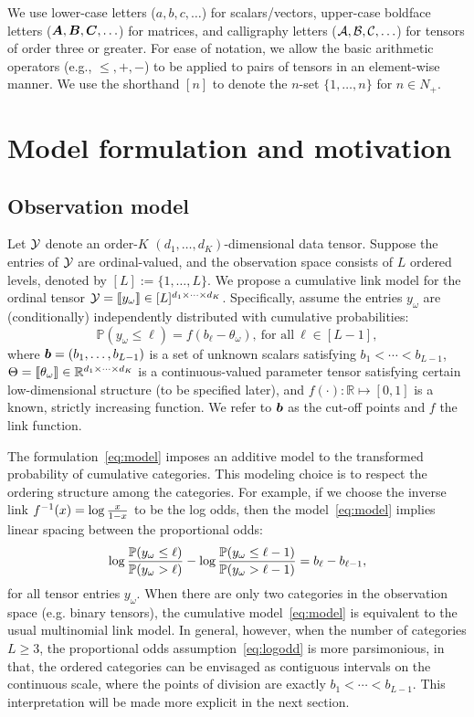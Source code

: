 \documentclass[11pt]{article}
\theoremstyle{plain}
\theoremstyle{definition}
\begin{document}
We use lower-case letters ($a, b, c, \ldots$) for scalars/vectors, upper-case boldface letters ($\bm A, \bm B, \bm C, \ldots$) for matrices, and calligraphy letters ($\mathcal{A},\mathcal{B},\mathcal{C},\ldots$) for tensors of order three or greater. For ease of notation, we allow the basic arithmetic operators (e.g., $\leq, +, -$) to be applied to pairs of tensors in an element-wise manner. We use the shorthand $[n]$ to denote the $n$-set $\{1,\ldots,n\}$ for $n \in N_{+}$.

\section{Model formulation and motivation}
\subsection{Observation model}
Let $\mathcal{Y}$ denote an order-$K$ $(d_1,\ldots,d_K)$-dimensional data tensor. Suppose the entries of $\mathcal{Y}$ are ordinal-valued, and the observation space consists of $L$ ordered levels, denoted by $[L]:=\{1,\ldots,L\}$. We propose a cumulative link model for the ordinal tensor $\mathcal{Y}=\llbracket y_\omega \rrbracket\in[L]^{d_1\times \cdots\times d_K}$. Specifically, assume the entries $y_\omega$ are (conditionally) independently distributed with cumulative probabilities:
\begin{equation}\label{eq:model}
\mathbb{P}(y_\omega\leq \ell)=f(b_\ell-\theta_\omega),\ \text{for all}\ \ell\in[L-1],
\end{equation}
where $\bm{b}=(b_1,\ldots,b_{L-1})$ is a set of unknown scalars satisfying $b_1<\cdots <b_{L-1}$, $\Theta=\llbracket \theta_\omega \rrbracket\in\mathbb{R}^{d_1\times \cdots \times d_K}$ is a continuous-valued parameter tensor satisfying certain low-dimensional structure (to be specified later), and $f(\cdot):\mathbb{R}\mapsto[0,1]$ is a known, strictly increasing function. We refer to $\bm{b}$ as the cut-off points and $f$ the link function.

The formulation~\eqref{eq:model} imposes an additive model to the transformed probability of cumulative categories. This modeling choice is to respect the ordering structure among the categories. For example, if we choose the inverse link $f^{-1}(x)=\log {x\over 1-x}$ to be the log odds, then the model~\eqref{eq:model} implies linear spacing between the proportional odds:
\begin{equation}\label{eq:logodd}
\log {\mathbb{P}(y_{\omega}\leq \ell) \over \mathbb{P}(y_\omega >  \ell) } - \log {\mathbb{P}(y_{\omega}\leq {\ell-1}) \over \mathbb{P}(y_\omega >  {\ell-1}) } = b_\ell-b_{\ell-1},
\end{equation}
for all tensor entries $y_\omega$. When there are only two categories in the observation space (e.g. binary tensors), the cumulative model~\eqref{eq:model} is equivalent to the usual multinomial link model. In general, however, when the number of categories $L\geq 3$, the proportional odds assumption~\eqref{eq:logodd} is more parsimonious, in that, the ordered categories can be envisaged as contiguous intervals on the continuous scale, where the points of division are exactly $b_1<\cdots <b_{L-1}$. This interpretation will be made more explicit in the next section.
\end{document}
